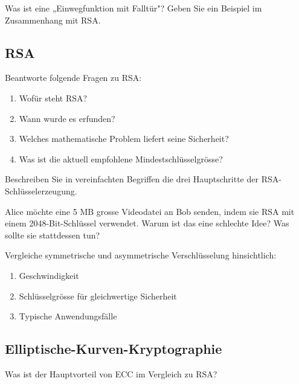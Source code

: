 \documentclass[11pt,a4paper]{report}
\begin{document}
\begin{ex}
Was ist eine „Einwegfunktion mit Falltür"? Geben Sie ein Beispiel im Zusammenhang mit RSA.
\end{ex}

\subsection{RSA}

\begin{ex}
Beantworte folgende Fragen zu RSA:
\begin{enumerate}[label=\alph*)]
    \item Wofür steht RSA?
    \item Wann wurde es erfunden?
    \item Welches mathematische Problem liefert seine Sicherheit?
    \item Was ist die aktuell empfohlene Mindestschlüsselgrösse?
\end{enumerate}
\end{ex}

\begin{ex}
Beschreiben Sie in vereinfachten Begriffen die drei Hauptschritte der RSA-Schlüsselerzeugung.
\end{ex}

\begin{ex}
Alice möchte eine 5 MB grosse Videodatei an Bob senden, indem sie RSA mit einem 2048-Bit-Schlüssel verwendet. Warum ist das eine schlechte Idee? Was sollte sie stattdessen tun?
\end{ex}

\begin{ex}
Vergleiche symmetrische und asymmetrische Verschlüsselung hinsichtlich:
\begin{enumerate}[label=\alph*)]
    \item Geschwindigkeit
    \item Schlüsselgrösse für gleichwertige Sicherheit
    \item Typische Anwendungsfälle
\end{enumerate}
\end{ex}

\subsection{Elliptische-Kurven-Kryptographie}

\begin{ex}
Was ist der Hauptvorteil von ECC im Vergleich zu RSA?
\end{ex}
\end{document}
